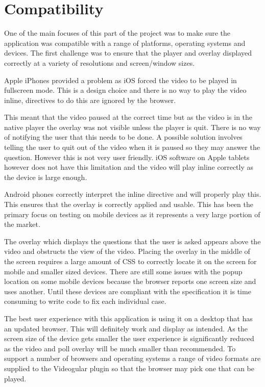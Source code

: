 \section{Compatibility} 
\label{Section:Compatibility}

One of the main focuses of this part of the project was to make sure the application was compatible with a range of platforms, operating systems and devices. The first challenge was to ensure that the player and overlay displayed correctly at a variety of resolutions and screen/window sizes. 

Apple iPhones provided a problem as iOS forced the video to be played in fullscreen mode. This is a design choice and there is no way to play the video inline, directives to do this are ignored by the browser.

This meant that the video paused at the correct time but as the video is in the native player the overlay was not visible unless the player is quit. There is no way of notifying the user that this needs to be done. A possible solution involves telling the user to quit out of the video when it is paused so they may answer the question. However this is not very user friendly. iOS software on Apple tablets however does not have this limitation and the video will play inline correctly as the device is large enough.

Android phones correctly interpret the inline directive and will properly play this. This ensures that the overlay is correctly applied and usable. This has been the primary focus on testing on mobile devices as it represents a very large portion of the market.

The overlay which displays the questions that the user is asked appears above the video and obstructs the view of the video. Placing the overlay in the middle of the screen requires a large amount of \gls{CSS} to correctly locate it on the screen for mobile and smaller sized devices. There are still some issues with the popup location on some mobile devices because the browser reports one screen size and uses another. Until these devices are compliant with the specification it is time consuming to write code to fix each individual case.

The best user experience with this application is using it on a desktop that has an updated browser. This will definitely work and display as intended. As the screen size of the device gets smaller the user experience is significantly reduced as the video and poll overlay will be much smaller than recommended. To support a number of browsers and operating systems a range of video formats are supplied to the \gls{Videogular} plugin so that the browser may pick one that can be played.

